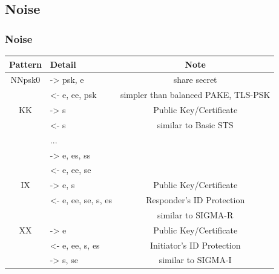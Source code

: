 \documentclass{ctexbeamer}
\begin{document}
\subsection{Noise}
\begin{frame}
    \frametitle{Noise}

    \begin{table}[width=\textwidth]
        \begin{tabular}{ |c|l|c| } \hline
            \textbf{Pattern} & \textbf{Detail} & \textbf{Note} \\ \hline
            NNpsk0 & -> psk, e  & share secret \\
            ~ & <- e, ee, psk & simpler than balanced PAKE, TLS-PSK \\ \hline
            KK & -> s & Public Key/Certificate \\
            ~ & <- s & similar to Basic STS \\
            ~ & ... & ~ \\
            ~ & -> e, es, ss & ~ \\
            ~ & <- e, ee, se & ~ \\ \hline
            IX & -> e, s & Public Key/Certificate \\
            ~  & <- e, ee, se, s, es & Responder's ID Protection \\ 
            ~ & ~ & similar to SIGMA-R \\ \hline
            XX & -> e & Public Key/Certificate \\
            ~ & <- e, ee, s, es & Initiator's ID Protection \\
            ~ & -> s, se & similar to SIGMA-I \\ \hline
        \end{tabular}
    \end{table}

\end{frame}
\end{document}
